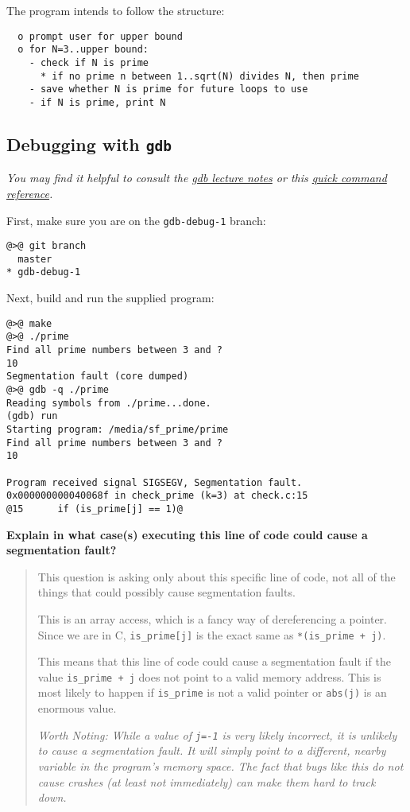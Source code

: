 \documentclass{article}
\begin{document}
The program intends to follow the structure:
\begin{lstlisting}
  o prompt user for upper bound
  o for N=3..upper bound:
    - check if N is prime
      * if no prime n between 1..sqrt(N) divides N, then prime
    - save whether N is prime for future loops to use
    - if N is prime, print N
\end{lstlisting}

\subsection{Debugging with \texttt{gdb}}

\emph{You may find it helpful to consult the
  \href{https://c4cs.github.io/lectures/f17/week11}{gdb lecture notes}
  or this
  \href{https://ccrma.stanford.edu/~jos/stkintro/Useful_commands_gdb.html}
  {quick command reference}.
}



First, make sure you are on the \texttt{gdb-debug-1} branch:
\begin{lstlisting}
@>@ git branch
  master
* gdb-debug-1
\end{lstlisting}

Next, build and run the supplied program:
\begin{lstlisting}
@>@ make
@>@ ./prime
Find all prime numbers between 3 and ?
10
Segmentation fault (core dumped)
@>@ gdb -q ./prime
Reading symbols from ./prime...done.
(gdb) run
Starting program: /media/sf_prime/prime 
Find all prime numbers between 3 and ?
10

Program received signal SIGSEGV, Segmentation fault.
0x000000000040068f in check_prime (k=3) at check.c:15
@15      if (is_prime[j] == 1)@
\end{lstlisting}

\textbf{Explain in what case(s) executing this line of code could cause a
  segmentation fault?}
\begin{quote}
  \color{violet}
  This question is asking only about this specific line of code, not all of
  the things that could possibly cause segmentation faults.

  This is an array access, which is a fancy way of dereferencing a pointer.
  Since we are in C, \texttt{is\_prime[j]} is the exact same as
  \texttt{*(is\_prime + j)}.

  This means that this line of code could cause a segmentation fault if the
  value \texttt{is\_prime + j} does not point to a valid memory address.
  This is most likely to happen if \texttt{is\_prime} is not a valid pointer
  or \texttt{abs(j)} is an enormous value.

  \emph{Worth Noting: While a value of \texttt{j=-1} is very likely incorrect,
    it is unlikely to cause a segmentation fault. It will simply point to a
    different, nearby variable in the program's memory space. The fact that
    bugs like this do not cause crashes (at least not immediately) can make
    them hard to track down.}
\end{quote}
\end{document}
